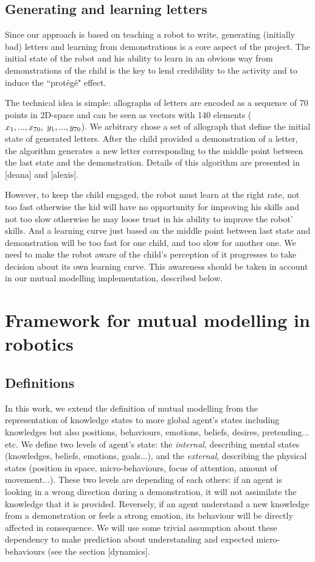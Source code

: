 \documentclass[10pt,a4paper,twocolumn]{article}
\begin{document}
\subsection{Generating and learning letters}

Since our approach is based on teaching a robot to write, generating (initially
bad) letters and learning from demonstrations is a core aspect of the project.
The initial state of the robot and his ability to learn in an obvious way
from demonstrations of the child is the key to lend credibility to the activity and to induce the ``prot\'eg\'e" effect.

The technical idea is simple: allographs of letters are encoded as a sequence of 70 points in
2D-space and can be seen as vectors with 140 elements
($x_1,...,x_{70},\hspace{1mm}y_1,...,y_{70}$). We arbitrary chose a set of allograph
that define the initial state of generated letters. 
After the child provided a demonstration of a letter, the algorithm
generates a new letter corresponding to the middle point between the last state and the
demonstration. Details of this algorithm are presented in [deana] and [alexis].

However, to keep the child engaged, the robot must learn at the right rate, not too fast otherwise the kid will have
no opportunity for improving his skills and not too slow otherwise he may loose
trust in his ability to improve the robot' skills. And a learning curve just based on the middle point between last state and demonstration will be too fast for one child, and too slow for another one. We need to make the robot aware of the child's perception of it progresses to take decision about its own learning curve. This awareness should be taken in account in our mutual modelling implementation, described below. 


\section{Framework for mutual modelling in robotics}

\subsection{Definitions}
In this work, we extend the definition of mutual modelling from the representation of knowledge states to more global agent's states including knowledges but also positions, behaviours, emotions, beliefs, desires, pretending... etc. We define two levels of agent's state: the \textit{internal}, describing mental states (knowledges, beliefs, emotions, goals...), and the \textit{external}, describing the physical states (position in space, micro-behaviours, focus of attention, amount of movement...). These two levels are depending of each others: if an agent is looking in a wrong direction during a demonstration, it will not assimilate the knowledge that it is provided. Reversely, if an agent understand a new knowledge from a demonstration or feels a strong emotion, its behaviour will be directly affected in consequence. We will use some trivial assumption about these dependency to make prediction about understanding and expected micro-behaviours (see the section [dynamics].
\end{document}
